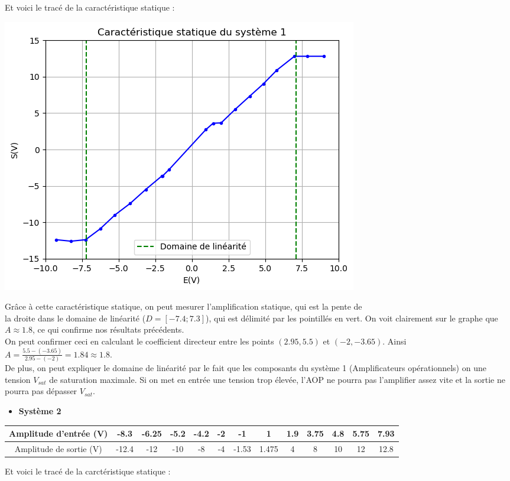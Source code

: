 \documentclass[12pt]{article}
\begin{document}
    Et voici le tracé de la caractéristique statique :
    \begin{center}
        \includegraphics{TP1/Syst_1/Carac_stat_1.png}
    \end{center} 
    Grâce à cette caractéristique statique, on peut mesurer l'amplification statique, qui est la pente de \\la droite dans le domaine de linéarité ($D = \left[-7.4;7.3\right]$), qui est délimité par les pointillés en vert. On voit clairement sur le graphe que $A\approx1.8$, ce qui confirme nos résultats précédents.
    \\On peut confirmer ceci en calculant le coefficient directeur entre les points $(2.95,5.5)$ et  $(-2,-3.65)$. Ainsi $A = \frac{5.5-(-3.65)}{2.95-(-2)} = 1.84 \approx 1.8$.
   \\De plus, on peut expliquer le domaine de linéarité par le fait que les composants du système 1 (Amplificateurs opérationnels) on une tension $V_{sat}$ de saturation maximale. Si on met en entrée une tension trop élevée, l'AOP ne pourra pas l'amplifier assez vite et la sortie ne pourra pas dépasser $V_{sat}$.
\newpage
    \begin{itemize}
    \item \bf \large Système 2
\end{itemize}
\begin{center}
\begin{tabular}{ |c|c|c|c|c|c|c|c|c|c|c|c|c|}

    \hline
    Amplitude d'entrée (V) & -8.3&-6.25&-5.2&-4.2&-2&-1&1&1.9&3.75&4.8&5.75&7.93\\
    \hline
    Amplitude de sortie (V) & -12.4&-12&-10&-8&-4&-1.53&1.475&4&8&10&12&12.8\\
    \hline
    \end{tabular}
\end{center}
Et voici le tracé de la carctéristique statique : 
\end{document}
